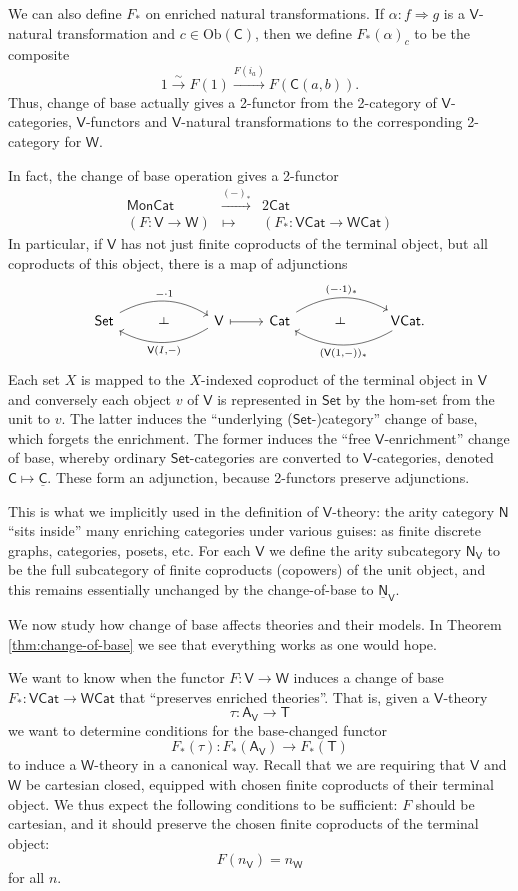 \documentclass{amsart}
\theoremstyle{definition}
\def\ld{\rotatebox[origin=c]{-90}{$\dashv$}} %
\newcommand{\Set}{\mathsf{Set}}
\newcommand{\Cat}{\mathsf{Cat}}
\newcommand{\Mon}{\mathsf{Mon}}
\newcommand{\NN}{\mathsf{N}}
\newcommand{\A}{\mathsf{A}}
\newcommand{\V}{\mathsf{V}}
\newcommand{\W}{\mathsf{W}}
\newcommand{\C}{\mathsf{C}}
\newcommand{\T}{\mathsf{T}}
\newcommand{\Obj}{\mathrm{Ob}}
\newcommand{\maps}{\colon}
\begin{document}
We can also define $F_*$ on enriched natural transformations.   If $\alpha\maps f \Rightarrow g$ is a $\V$-natural transformation and $c\in \Obj(\C)$, then we define $F_*(\alpha)_c$ to be the composite
\[      1 \stackrel{\sim}{\longrightarrow} F(1) \stackrel{F(i_a)}{\longrightarrow}
F(\C(a,b)) .\]   
Thus, change of base actually gives a 2-functor from the 2-category of $\V$-categories, 
$\V$-functors and $\V$-natural transformations to the corresponding 2-category for $\W$.

In fact, the change of base operation gives a 2-functor
\[\begin{array}{ccc}
\Mon\Cat & \xrightarrow{(-)_*} & 2\Cat\\
(F\maps \V\to\W) & \mapsto & (F_*\maps \V\Cat\to\W\Cat)
\end{array}\]
In particular, if $\V$ has not just finite coproducts of the terminal object, but all 
coproducts of this object, there is a map of adjunctions
\[\begin{tikzcd}
	\Set \arrow[bend left,below]{rr}{-\cdot 1}
	& \ld &
	\arrow[bend left,above]{ll}{\V(I,-)} \V
	\arrow[maps to]{r}
	& \Cat \arrow[bend left,below]{rr}{(-\cdot 1)_*}
	& \ld &
	\arrow[bend left,above]{ll}{(\V(1,-))_*} \V\Cat.
\end{tikzcd}\]
Each set $X$ is mapped to the $X$-indexed coproduct of the terminal object in $\V$ and conversely each object $v$ of $\V$ is represented in $\Set$ by the hom-set from the unit to $v$. The latter induces the ``underlying ($\Set$-)category'' change of base, which forgets the enrichment. The former induces the ``free $\V$-enrichment'' change of base, whereby ordinary $\Set$-categories are converted to $\V$-categories, denoted $\C \mapsto \underline{\C}$. These form an adjunction, because 2-functors preserve adjunctions.

This is what we implicitly used in the definition of $\V$-theory: the arity category $\NN$ ``sits inside'' many enriching categories under various guises: as finite discrete graphs, categories, posets, etc. For each $\V$ we define the arity subcategory $\NN_\V$ to be the full subcategory of finite coproducts (copowers) of the unit object, and this remains essentially unchanged by the change-of-base to $\underline{\NN}_\V$.

We now study how change of base affects theories and their models.  In Theorem \ref{thm:change-of-base} we see that everything works as one would hope.

We want to know when the functor $F \maps \V \to \W$ induces a change of base $F_*\maps\V\Cat \to \W\Cat$ that ``preserves enriched theories''.   That is, given a $\V$-theory 
\[      \tau \maps  \A_\V \to \T \]
we want to determine conditions for the base-changed functor 
\[    F_*(\tau) \maps  F_*(\A_\V) \to  F_*(\T) \]
to induce a $\W$-theory in a canonical way.   Recall that we are requiring that $\V$ and $\W$ be
cartesian closed, equipped with chosen finite coproducts of their terminal object.   We thus 
expect the following conditions to be sufficient: $F$ should be cartesian, and it should
preserve the chosen finite coproducts of the terminal object:
\[      F(n_\V) = n_\W  \]
for all $n$.   
\end{document}
